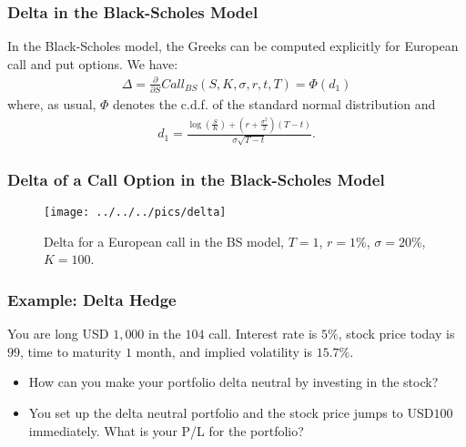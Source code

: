 \begin{frame}[fragile]
\frametitle{Delta in the Black-Scholes Model}
In the Black-Scholes model, the Greeks can be computed explicitly for
European call and put options. We have:
\begin{align*}
  \Delta = \frac{\partial}{\partial S}Call_{BS}(S,K,\sigma,r,t,T) = \Phi(d_1)
\end{align*}
where, as usual, $\Phi$ denotes the c.d.f. of the standard normal distribution and 
\begin{align*}
  d_1 = \frac{\log \left( \frac{S}{K} \right) + \left( r + \frac{\sigma^2}{2}
  \right)(T-t)}{\sigma \sqrt{T-t}}.
\end{align*}
\end{frame}

\begin{frame}[fragile]
\frametitle{Delta of a Call Option in the Black-Scholes Model}
\begin{figure}[htp]
\begin{center}
  \texttt{[image: ../../../pics/delta]}
  \caption{Delta for a European call in the BS model, $T=1$, $r=1\%$,
  $\sigma=20\%$, $K=100$.}
  \label{fig:deltaBS}
\end{center}
\end{figure}
\end{frame}

\begin{frame}[fragile]
\frametitle{Example: Delta Hedge}
You are long USD $1,000$ in the $104$ call. Interest rate is $5\%$,
stock price today is $99$, time to maturity $1$ month, and implied volatility is
$15.7\%$. 
\begin{itemize}
  \item How can you make your portfolio delta neutral by investing in the stock?
  \item You set up the delta neutral portfolio and the stock price jumps to
  USD$100$ immediately. What is your P/L for the portfolio?
\end{itemize}

\end{frame}

